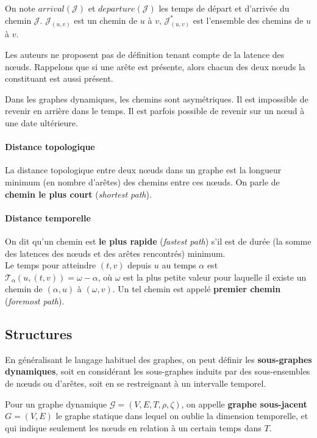 \documentclass[12pt,a4paper]{article}
\begin{document}
On note \(arrival(\mathcal{J})\) et \(departure(\mathcal{J})\) les
temps de départ et d'arrivée du chemin
\(\mathcal{J}\). \(\mathcal{J}_{(u, v)}\) est un chemin de \(u\) à
\(v\), \(\mathcal{J}_{(u, v)}^*\) est l'ensemble des chemins de \(u\)
à \(v\).

Les auteurs ne proposent pas de définition tenant compte de la latence
des nœuds. Rappelons que si une arête est présente, alors chacun des
deux nœuds la constituant est aussi présent.

Dans les graphes dynamiques, les chemins sont asymétriques. Il est
impossible de revenir en arrière dans le temps. Il est parfois
possible de revenir sur un nœud à une date ultérieure.

\paragraph{Distance topologique} La distance topologique entre deux
nœuds dans un graphe est la longueur minimum (en nombre d'arêtes) des
chemins entre ces nœuds. On parle de \textbf{chemin le plus court}
(\textit{shortest path}).

\paragraph{Distance temporelle}
On dit qu'un chemin est \textbf{le plus rapide} (\textit{fastest
  path}) s'il est de durée (la somme des latences des nœuds et des
arêtes rencontrés) minimum.\\
Le temps pour atteindre \((t, v)\) depuis \(u\) au temps \(\alpha\)
est \(\mathcal{T}_{\alpha}(u, (t, v)) = \omega - \alpha\), où
\(\omega\) est la plus petite valeur pour laquelle il existe un chemin
de \((\alpha, u)\) à \((\omega, v)\). Un tel chemin est appelé
\textbf{premier chemin} (\textit{foremost path}).

\subsection{Structures}

En généralisant le langage habituel des graphes, on peut définir les
\textbf{sous-graphes dynamiques}, soit en considérant les sous-graphes
induits par des sous-ensembles de nœuds ou d'arêtes, soit en se
restreignant à un intervalle temporel.

Pour un graphe dynamique \(\mathcal{G} = (V, E, T, \rho, \zeta)\), on
appelle \textbf{graphe sous-jacent} \(G = (V, E)\) le graphe statique
dans lequel on oublie la dimension temporelle, et qui indique
seulement les nœuds en relation à un certain temps dans \(T\).
\end{document}
